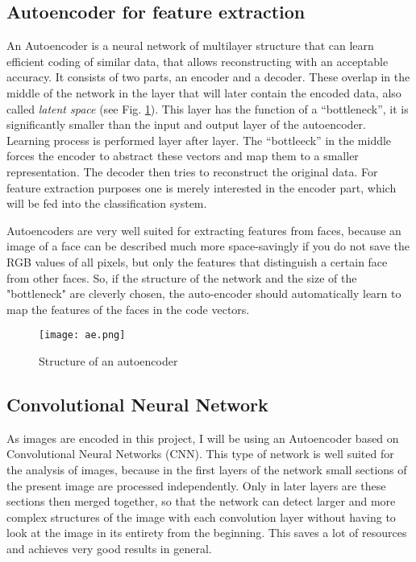 \subsection{Autoencoder for feature extraction}
An Autoencoder is a neural network of multilayer structure that can learn
efficient coding of similar data, that allows reconstructing with an acceptable
accuracy. It consists of two parts, an encoder and a decoder. These overlap in
the middle of the network in the layer that will later contain the encoded data,
also called \textit{latent space} (see Fig. \ref{ae}). This layer has the function of a
``bottleneck'', it is significantly smaller than the input and output layer of
the autoencoder. Learning process is performed layer after layer. The
``bottleeck'' in the middle forces the encoder to abstract these vectors and
map them to a smaller representation. The decoder then tries to reconstruct the
original data. For feature extraction purposes one is merely interested in the
encoder part, which will be fed into the classification system.

Autoencoders are very well suited for extracting features from faces, because an
image of a face can be described much more space-savingly if you do not save the
RGB values of all pixels, but only the features that distinguish a certain face
from other faces. So, if the structure of the network and the size of the
"bottleneck" are cleverly chosen, the auto-encoder should automatically learn to
map the features of the faces in the code vectors. 

\begin{figure}[h]
  \centering
  \texttt{[image: ae.png]}
  \caption{Structure of an autoencoder}
  \label{ae}
\end{figure}

\subsection{Convolutional Neural Network}
As images are encoded in this project, I will be using an Autoencoder based on
Convolutional Neural Networks (CNN). This type of network is well suited for the
analysis of images, because in the first layers of the network small sections of
the present image are processed independently. Only in later layers are these
sections then merged together, so that the network can detect larger and more
complex structures of the image with each convolution layer without having to
look at the image in its entirety from the beginning. This saves a lot of
resources and achieves very good results in general. 

